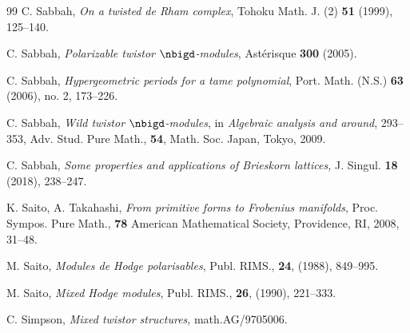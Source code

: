 \documentclass[a4,10pt]{article}
\begin{document}
\begin{thebibliography}{99}
	 C. Sabbah,
	 {\em On a twisted de Rham complex},
	 Tohoku Math. J. (2) {\bf 51} (1999), 125--140.
	 
	 C. Sabbah, {\em Polarizable twistor $\nbigd$-modules},
	 Ast\'{e}risque {\bf 300} (2005).

	 C. Sabbah,
	 {\em Hypergeometric periods for a tame polynomial},
	 Port. Math. (N.S.) {\bf 63} (2006), no. 2, 173--226.
	
	C. Sabbah,
	{\em Wild twistor $\nbigd$-modules},
	in {\em Algebraic analysis and around},
	293--353, Adv. Stud. Pure Math., {\bf 54},
	Math. Soc. Japan, Tokyo, 2009. 

	 C. Sabbah,
	 {\em Some properties and applications of Brieskorn lattices,}
	 J. Singul. {\bf 18} (2018), 238--247.
 
	 K. Saito, A. Takahashi,
	 {\em From primitive forms to Frobenius manifolds},
	 Proc. Sympos. Pure Math., {\bf 78}
	 American Mathematical Society, Providence, RI, 2008, 31--48.
	
M. Saito,
{\em Modules de Hodge polarisables},
Publ. RIMS., {\bf 24},
(1988), 849--995.

M. Saito,
{\em Mixed Hodge modules},
Publ. RIMS., {\bf 26}, (1990),
221--333.

C. Simpson,
{\it Mixed twistor structures},
math.AG/9705006.
	
\end{thebibliography}
\end{document}
